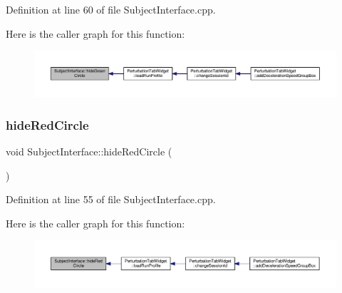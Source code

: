 Definition at line 60 of file Subject\+Interface.\+cpp.

Here is the caller graph for this function\+:
\nopagebreak
\begin{figure}[H]
\begin{center}
\leavevmode
\includegraphics[width=350pt]{class_subject_interface_a94f913d3a6bd8719617bcdd7950d7dba_icgraph}
\end{center}
\end{figure}
\mbox{\label{class_subject_interface_a4180ce5ba88bd958c3be49ab1f7a69cf}} 
\subsubsection{\texorpdfstring{hide\+Red\+Circle}{hideRedCircle}}
{\footnotesize\ttfamily void Subject\+Interface\+::hide\+Red\+Circle (\begin{DoxyParamCaption}{ }\end{DoxyParamCaption})\hspace{0.3cm}{\ttfamily [slot]}}



Definition at line 55 of file Subject\+Interface.\+cpp.

Here is the caller graph for this function\+:
\nopagebreak
\begin{figure}[H]
\begin{center}
\leavevmode
\includegraphics[width=350pt]{class_subject_interface_a4180ce5ba88bd958c3be49ab1f7a69cf_icgraph}
\end{center}
\end{figure}
\mbox{\label{class_subject_interface_ae3758be4462ddf57f8f97acfc1d17538}} 
